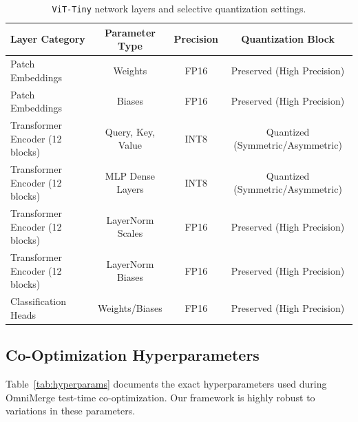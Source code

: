 \documentclass{article}
\theoremstyle{plain}
\theoremstyle{definition}
\theoremstyle{remark}
\begin{document}
\begin{table}[h]
\caption{\texttt{ViT-Tiny} network layers and selective quantization settings.}
\label{tab:vit_layers}
\vskip 0.15in
\begin{center}
\begin{small}
\begin{sc}
\begin{tabular}{lccc}
\toprule
Layer Category & Parameter Type & Precision & Quantization Block \\
\midrule
Patch Embeddings & Weights & FP16 & Preserved (High Precision) \\
Patch Embeddings & Biases & FP16 & Preserved (High Precision) \\
\midrule
Transformer Encoder (12 blocks) & Query, Key, Value & INT8 & Quantized (Symmetric/Asymmetric) \\
Transformer Encoder (12 blocks) & MLP Dense Layers & INT8 & Quantized (Symmetric/Asymmetric) \\
Transformer Encoder (12 blocks) & LayerNorm Scales & FP16 & Preserved (High Precision) \\
Transformer Encoder (12 blocks) & LayerNorm Biases & FP16 & Preserved (High Precision) \\
\midrule
Classification Heads & Weights/Biases & FP16 & Preserved (High Precision) \\
\bottomrule
\end{tabular}
\end{sc}
\end{small}
\end{center}
\vskip -0.1in
\end{table}

\subsection{Co-Optimization Hyperparameters}
Table~\ref{tab:hyperparams} documents the exact hyperparameters used during OmniMerge test-time co-optimization. Our framework is highly robust to variations in these parameters.
\end{document}
